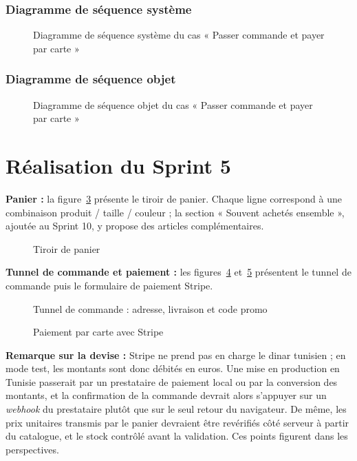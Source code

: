 \subsubsection{Diagramme de séquence système}
\begin{figure}[H]
    \centering
    \caption{Diagramme de séquence système du cas « Passer commande et payer par carte »}
    \label{fig:dss-commande}
\end{figure}

\subsubsection{Diagramme de séquence objet}
\begin{figure}[H]
    \centering
    \caption{Diagramme de séquence objet du cas « Passer commande et payer par carte »}
    \label{fig:dso-commande}
\end{figure}

\section{Réalisation du Sprint 5}
\textbf{Panier :} la figure~\ref{fig:ui-panier} présente le tiroir de panier. Chaque ligne correspond à une combinaison produit / taille / couleur ; la section « Souvent achetés ensemble », ajoutée au Sprint 10, y propose des articles complémentaires.
\begin{figure}[H]
    \centering
    \caption{Tiroir de panier}
    \label{fig:ui-panier}
\end{figure}

\textbf{Tunnel de commande et paiement :} les figures~\ref{fig:ui-checkout} et~\ref{fig:ui-stripe} présentent le tunnel de commande puis le formulaire de paiement Stripe.
\begin{figure}[H]
    \centering
    \caption{Tunnel de commande : adresse, livraison et code promo}
    \label{fig:ui-checkout}
\end{figure}
\begin{figure}[H]
    \centering
    \caption{Paiement par carte avec Stripe}
    \label{fig:ui-stripe}
\end{figure}

\textbf{Remarque sur la devise :} Stripe ne prend pas en charge le dinar tunisien ; en mode test, les montants sont donc débités en euros. Une mise en production en Tunisie passerait par un prestataire de paiement local ou par la conversion des montants, et la confirmation de la commande devrait alors s'appuyer sur un \textit{webhook} du prestataire plutôt que sur le seul retour du navigateur. De même, les prix unitaires transmis par le panier devraient être revérifiés côté serveur à partir du catalogue, et le stock contrôlé avant la validation. Ces points figurent dans les perspectives.

